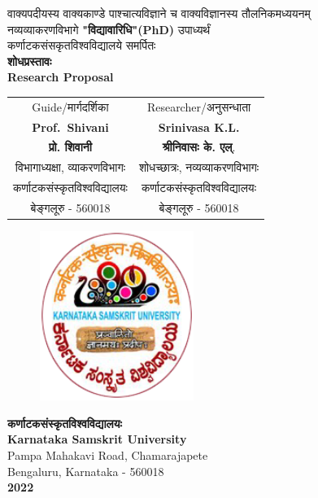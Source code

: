 \documentclass[12pt,a4paper]{report}
\begin{document}
\begin{center}
\thispagestyle{empty}
{\fontsize{25pt}{27pt}\selectfont वाक्यपदीयस्य वाक्यकाण्डे पाश्चात्यविज्ञाने च वाक्यविज्ञानस्य तौलनिकमध्ययनम्}\\
\vfill
{\large नव्यव्याकरणविभागे {\bf "विद्यावारिधि"(PhD) }उपाध्यर्थं\\ कर्णाटकसंसकृतविश्वविद्यालये समर्पितः\\}
\vfill
{\Large\bfseries शोधप्रस्तावः\\Research Proposal}
\vfill

\begin{tabular}{ c @{\hspace{2cm}}c  }
Guide/मार्गदर्शिका & Researcher/अनुसन्धाता\\
{\bf Prof.\ Shivani } & {\bf Srinivasa K.L.}\\
{\bf प्रो. शिवानी } & {\bf श्रीनिवासः के. एल्}.\\
विभागाध्यक्षा, व्याकरणविभागः& शोधच्छात्रः, नव्यव्याकरणविभागः \\
कर्णाटकसंस्कृतविश्वविद्यालयः & कर्णाटकसंस्कृतविश्वविद्यालयः\\
बेङ्गलूरु - 560018 & बेङ्गलूरु - 560018
\end{tabular}
\vfill
\begin{figure}[h]
\centering
\includegraphics[width=5cm]{KSU_Logo}

\end{figure}

{\Large\bfseries कर्णाटकसंस्कृतविश्वविद्यालयः\\
 Karnataka Samskrit University\\}
Pampa Mahakavi Road, Chamarajapete\\
Bengaluru, Karnataka - 560018\\
{\bf 2022}

\end{center} 
\newpage
\begin{spacing}{2}
\fontsize{14pt}{16pt}\selectfont

\end{spacing}
\end{document}
